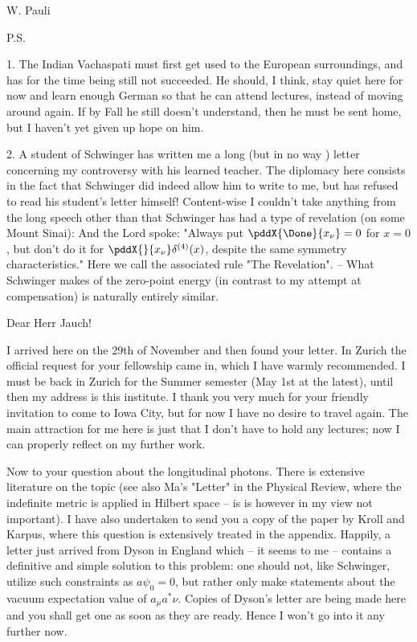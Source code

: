 \documentclass{article}
\begin{document}
W. Pauli

P.S.

1. The Indian Vachaspati must first get used to the European surroundings, and has for the time being still not succeeded. He should, I think, stay quiet here for now and learn enough German so that he can attend lectures, instead of moving around again. If by Fall he still doesn't understand, then he must be sent home, but I haven't yet given up hope on him.

2. A student of Schwinger has written me a long (but in no way ) letter concerning my controversy with his learned teacher. The diplomacy here consists in the fact that Schwinger did indeed allow him to write to me, but has refused to read his student's letter himself! Content-wise I couldn't take anything from the long speech other than that Schwinger has had a type of revelation (on some Mount Sinai): And the Lord spoke: "Always put $\pddX{\Done}{x_\nu}=0$ for $x=0$, but don't do it for $\pddX{}{x_\nu}\delta^{(4)}(x)$, despite the same symmetry characteristics." Here we call the associated rule "The Revelation". -- What Schwinger makes of the zero-point energy (in contrast to my attempt at compensation) is naturally entirely similar.

\date{December 1, 1949}

Dear Herr Jauch!

I arrived here on the 29th of November and then found your letter. In Zurich the official request for your fellowship came in, which I have warmly recommended. I must be back in Zurich for the Summer semester (May 1st at the latest), until then my address is this institute. I thank you very much for your friendly invitation to come to Iowa City, but for now I have no desire to travel again. The main attraction for me here is just that I don't have to hold any lectures; now I can properly reflect on my further work.

Now to your question about the longitudinal photons. There is extensive literature on the topic (see also Ma's "Letter" in the Physical Review, where the indefinite metric is applied in Hilbert space -- is is however in my view not important). I have also undertaken to send you a copy of the paper by Kroll and Karpus, where this question is extensively treated in the appendix. Happily, a letter just arrived from Dyson in England which -- it seems to me -- contains a definitive and simple solution to this problem: one should not, like Schwinger, utilize such constraints as $a\psi_0 = 0$, but rather only make statements about the vacuum expectation value of $a_\mu a^*\nu$. Copies of Dyson's letter are being made here and you shall get one as soon as they are ready. Hence I won't go into it any further now.
\end{document}
